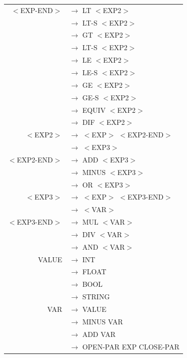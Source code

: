 \documentclass[a4paper,10pt]{article}
\begin{document}
\begin{tabular}{rl}
					
$<$EXP-END$>$		& $\rightarrow$ LT $<$EXP2$>$\\
					& $\rightarrow$ LT-S $<$EXP2$>$\\
					& $\rightarrow$ GT $<$EXP2$>$\\
					& $\rightarrow$ LT-S $<$EXP2$>$\\
					& $\rightarrow$ LE $<$EXP2$>$\\
					& $\rightarrow$ LE-S $<$EXP2$>$\\
					& $\rightarrow$ GE $<$EXP2$>$\\
					& $\rightarrow$ GE-S $<$EXP2$>$\\
					& $\rightarrow$ EQUIV $<$EXP2$>$\\
					& $\rightarrow$ DIF $<$EXP2$>$\\
										
					
$<$EXP2$>$			& $\rightarrow$ $<$EXP$>$ $<$EXP2-END$>$\\
					& $\rightarrow$ $<$EXP3$>$\\
					
$<$EXP2-END$>$		& $\rightarrow$  ADD $<$EXP3$>$\\
					& $\rightarrow$  MINUS $<$EXP3$>$\\
					& $\rightarrow$  OR $<$EXP3$>$\\					

					
$<$EXP3$>$			& $\rightarrow$ $<$EXP$>$ $<$EXP3-END$>$\\
					& $\rightarrow$ $<$VAR$>$\\
					
$<$EXP3-END$>$		& $\rightarrow$ MUL $<$VAR$>$\\
					& $\rightarrow$ DIV $<$VAR$>$\\
					& $\rightarrow$ AND $<$VAR$>$\\

VALUE				& $\rightarrow$ INT \\
					& $\rightarrow$ FLOAT \\
					& $\rightarrow$ BOOL \\
					& $\rightarrow$ STRING \\
					
VAR					& $\rightarrow$ VALUE \\
					& $\rightarrow$ MINUS VAR\\
					& $\rightarrow$ ADD VAR \\
					& $\rightarrow$ OPEN-PAR EXP CLOSE-PAR \\

\end{tabular}
~\\
\end{document}

